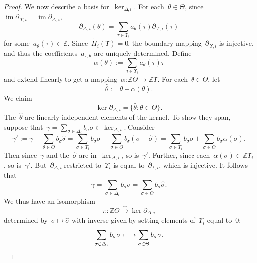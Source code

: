 \documentclass[12pt]{article}
\newcommand{\Z}{\mathbb{Z}}
\newcommand{\tH}{\widetilde{H}}
\DeclareMathOperator{\im}{\mathrm{im}}
\newcommand{\pup}[1]{\partial_{\,\Upsilon,{#1}}}
\theoremstyle{definition}
\theoremstyle{remark}
\begin{document}
\begin{proof}
  We now describe a basis for~$\ker_{\Delta,i}$.  For each~$\theta\in\Theta$,
  since~$\im\pup{i}=\im\partial_{\Delta,i}$, 
  \begin{equation}\label{eqn: coords}
    \partial_{\Delta,i}(\theta)=\sum_{\tau\in\Upsilon_i}a_{\theta}(\tau)\pup{i}(\tau)
  \end{equation}
  for some~$a_{\theta}(\tau)\in\Z$.  Since~$\tH_i(\Upsilon)=0$, the boundary
  mapping~$\pup{i}$ is injective, and thus the coefficients~$a_{\tau,\theta}$ are
  uniquely determined. Define
  \[
    \alpha(\theta):=\sum_{\tau\in\Upsilon_i}a_{\theta}(\tau)\tau
  \]
  and extend linearly to get a mapping~$\alpha:\Z\Theta\to\Z\Upsilon$.
  For each~$\theta\in\Theta$, let
  \[
    \hat{\theta}:=\theta-\alpha(\theta).
  \]
  We claim 
  \[
    \ker\partial_{\Delta,i}
    =\{\hat{\theta}:\theta\in\Theta\}.
  \]
  The~$\hat{\theta}$ are linearly independent elements of the kernel.
  To show they span, suppose that~$\gamma=\sum_{\sigma\in\Delta_i}b_{\sigma}\sigma\in\ker_{\Delta,i}$. 
  Consider
  \[
    \gamma':=\gamma-\sum_{\theta\in\Theta}b_{\sigma}\hat{\sigma}
    =\sum_{\sigma\in\Upsilon_i}b_{\sigma}\sigma+\sum_{\sigma\in\Theta}b_{\sigma}(\sigma-\hat{\sigma})
    =\sum_{\sigma\in\Upsilon_i}b_{\sigma}\sigma+\sum_{\sigma\in\Theta}b_{\sigma}\alpha(\sigma).
  \]
  Then since~$\gamma$ and the~$\hat{\sigma}$ are in~$\ker_{\Delta,i}$, so
is~$\gamma'$.  Further, since each~$\alpha(\sigma)\in\Z\Upsilon_i$, so
  is~$\gamma'$.  But~$\partial_{\Delta,i}$ restricted to~$\Upsilon_i$ is equal
  to~$\partial_{\Upsilon,i}$, which is injective. It follows that
  \[
    \gamma=\sum_{\sigma\in\Delta_i}b_{\sigma}\sigma=\sum_{\sigma\in\Theta}b_{\sigma}\hat{\sigma}.
  \]
  We thus have an isomorphism
  \[
    \pi\colon
    \Z\Theta\xrightarrow{\ \sim\ }\ker\partial_{\Delta,i}
  \]
  determined by~$\sigma\mapsto\hat{\sigma}$ with inverse given by setting
  elements of~$\Upsilon_i$ equal to~$0$:
  \[
    \sum_{\sigma\in\Delta_i}b_{\sigma}\sigma\xmapsto{\quad\ } \sum_{\sigma\in\Theta}b_{\sigma}\sigma.
  \]


\end{proof}
\end{document}
